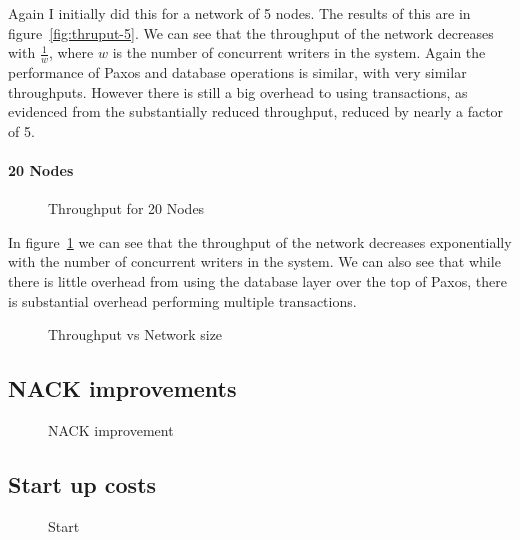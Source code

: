 \documentclass[12pt,twoside,notitlepage]{report}
\newcommand{\lwincludegraphics}[2][]{%
  \sbox{0}{\texttt{[image: \#2]}}%
  \ifdim\wd0>\linewidth
    \resizebox{\linewidth}{!}{\box0 }%
  \else
    \leavevmode\box0
  \fi}
\begin{document}
Again I initially did this for a network of 5 nodes. The results of this are in
figure~\ref{fig:thruput-5}. We can see that the throughput of the network decreases with
$\frac{1}{w}$, where $w$ is the number of concurrent writers in the system. Again the performance of
Paxos and database operations is similar, with very similar throughputs. However there is still a
big overhead to using transactions, as evidenced from the substantially reduced throughput,
reduced by nearly a factor of 5.

\paragraph{20 Nodes}

\begin{figure}[H]
\centering
\lwincludegraphics[scale=2]{figs/thru_20.eps}
\caption{\label{fig:thruput-20}Throughput for 20 Nodes}
\end{figure}

In figure~\ref{fig:thruput-20} we can see that the throughput of the network decreases
exponentially with the number of concurrent writers in the system. We can also see that while
there is little overhead from using the database layer over the top of Paxos, there is substantial
overhead performing multiple transactions.

\begin{figure}[H]
\centering
\lwincludegraphics[scale=2]{figs/thru_rev.eps}
\caption{\label{fig:thruput-rev}Throughput vs Network size}
\end{figure}

\subsection{NACK improvements}

\begin{figure}[H]
\centering
\lwincludegraphics[scale=2]{figs/lat_nack.eps}
\caption{\label{fig:nack}NACK improvement}
\end{figure}

\subsection{Start up costs}

\begin{figure}[H]
\centering
\lwincludegraphics[scale=2]{figs/start.eps}
\caption{\label{fig:start}Start}
\end{figure}
\end{document}
